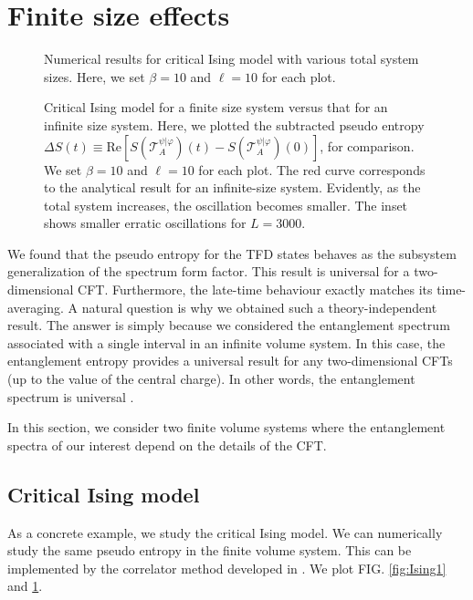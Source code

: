 \documentclass[%
twocolumn, 
secnumarabic,amssymb, preprintnumbers, superscriptaddress, aps, prl]{revtex4-1}
\begin{document}
\section{Finite size effects}

\begin{figure}[t]
 \begin{center}
 \end{center}
 \caption{Numerical results for critical Ising model with various total system sizes. Here, we set $\beta=10$ and $\ell=10$ for each plot.}
 \label{fig:Ising1}
 \begin{center}
 \end{center}
 \caption{Critical Ising model for a finite size system versus that for an infinite size system. Here, we plotted the subtracted pseudo entropy
$\Delta S(t)\equiv \mathrm{Re}[S(\mathcal{T}^{\psi|\varphi}_A)(t)-S(\mathcal{T}^{\psi|\varphi}_A)(0)]$,
for comparison. We set $\beta=10$ and $\ell=10$ for each plot. The red curve corresponds to the analytical result for an infinite-size system. Evidently, as the total system increases, the oscillation becomes smaller. The inset shows smaller erratic oscillations for $L=3000$.}
 \label{fig:Ising2}
\end{figure}


We found that the pseudo entropy for the TFD states behaves as the subsystem generalization of the spectrum form factor. This result is universal for a two-dimensional CFT. Furthermore, the late-time behaviour exactly matches its time-averaging. 
A natural question is why we obtained such a theory-independent result. 
The answer is simply because we considered the entanglement spectrum associated with a single interval in an infinite volume system. In this case, the entanglement entropy provides a universal result for any two-dimensional CFTs (up to the value of the central charge). In other words, the entanglement spectrum is universal \cite{Calabrese_2008}. 

In this section, we consider two finite volume systems where the entanglement spectra of our interest depend on the details of the CFT. 

\subsection{Critical Ising model}
As a concrete example, we study the critical Ising model.
We can numerically study the same pseudo entropy in the finite volume system. 
This can be implemented by the correlator method developed in \cite{Mollabashi:2020yie,Mollabashi:2021xsd}. We plot FIG. \ref{fig:Ising1} and \ref{fig:Ising2}.
\end{document}
